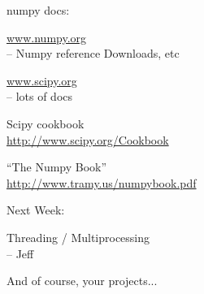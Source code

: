 \documentclass{beamer}
\begin{document}
\begin{frame}[fragile]{numpy docs:}

\url{www.numpy.org}\\
   -- Numpy reference Downloads, etc

\vfill
\url{www.scipy.org}\\
   -- lots of docs

\vfill
{\large Scipy cookbook}\\
\url{http://www.scipy.org/Cookbook}

\vfill
{\large ``The Numpy Book''}\\
\url{http://www.tramy.us/numpybook.pdf}


\end{frame} 





\begin{frame}[fragile]{Next Week:}

\vfill
{\LARGE Threading / Multiprocessing}\\[0.2in]
{\Large  \hspace{0.5in} -- Jeff}


\vfill
{\Large And of course, your projects...}

\vfill

\end{frame}
\end{document}
